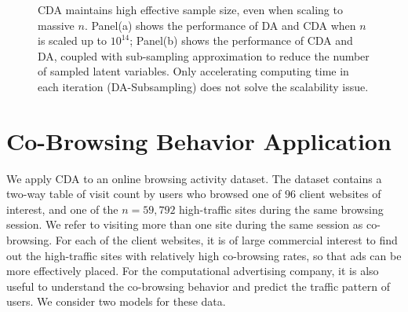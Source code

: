 \documentclass[12pt]{article}
\begin{document}
\begin{figure}[H]
  {\caption{CDA  maintains high effective sample size, even when scaling
 to massive $n$. Panel(a) shows the performance of DA and CDA when $n$ is scaled up to
 $10^{14}$; Panel(b) shows the performance of CDA and DA, coupled with sub-sampling
 approximation to reduce the number of sampled latent variables. Only accelerating computing time in each iteration (DA-Subsampling) does not solve the scalability issue.      \label{massive_n_sims}}}
  {%
    \qquad
  }
\end{figure}



 \section{Co-Browsing Behavior Application}

We apply CDA to an online browsing activity dataset. The dataset contains a two-way  table of visit count by users who browsed one of $96$ client websites of interest, and one of the  $n=59,792$ high-traffic sites during the same browsing session. We refer to visiting more than one site during the same session as co-browsing. For each of the client websites, it is of large commercial interest to find out the high-traffic sites with relatively high co-browsing rates, so that ads can be more effectively placed. For the computational advertising company, it is also useful to understand the co-browsing behavior and predict the traffic pattern of users. We consider two models for these data.
\end{document}
